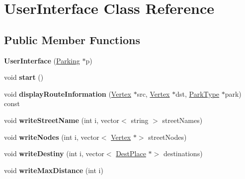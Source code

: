 \hypertarget{class_user_interface}{}\section{User\+Interface Class Reference}
\label{class_user_interface}
\subsection*{Public Member Functions}
\begin{DoxyCompactItemize}
\item 
\hypertarget{class_user_interface_a569e0a5f433d597e656022bd90b9259a}{}\label{class_user_interface_a569e0a5f433d597e656022bd90b9259a} 
{\bfseries User\+Interface} (\hyperlink{class_parking}{Parking} $\ast$p)
\item 
\hypertarget{class_user_interface_a79350878c72585ae34e4321613ed2c1a}{}\label{class_user_interface_a79350878c72585ae34e4321613ed2c1a} 
void {\bfseries start} ()
\item 
\hypertarget{class_user_interface_a888e925ed97f4f5638888541c9b7cef3}{}\label{class_user_interface_a888e925ed97f4f5638888541c9b7cef3} 
void {\bfseries display\+Route\+Information} (\hyperlink{class_vertex}{Vertex} $\ast$src, \hyperlink{class_vertex}{Vertex} $\ast$dst, \hyperlink{class_park_type}{Park\+Type} $\ast$park) const
\item 
\hypertarget{class_user_interface_a100153eda48264c4c42b4a160154d509}{}\label{class_user_interface_a100153eda48264c4c42b4a160154d509} 
void {\bfseries write\+Street\+Name} (int i, vector$<$ string $>$ street\+Names)
\item 
\hypertarget{class_user_interface_a435af017d1108efb94c432ca1da7f781}{}\label{class_user_interface_a435af017d1108efb94c432ca1da7f781} 
void {\bfseries write\+Nodes} (int i, vector$<$ \hyperlink{class_vertex}{Vertex} $\ast$$>$ street\+Nodes)
\item 
\hypertarget{class_user_interface_a371d1bf51f34aaf27a43ab9f9a2f2ec6}{}\label{class_user_interface_a371d1bf51f34aaf27a43ab9f9a2f2ec6} 
void {\bfseries write\+Destiny} (int i, vector$<$ \hyperlink{class_dest_place}{Dest\+Place} $\ast$$>$ destinations)
\item 
\hypertarget{class_user_interface_a0c2643f4ea48fbbac3f62810ecba1ccd}{}\label{class_user_interface_a0c2643f4ea48fbbac3f62810ecba1ccd} 
void {\bfseries write\+Max\+Distance} (int i)
\item 
\hypertarget{class_user_interface_acc1ec31ca4b80b81f6888745939c2075}{}\label{class_user_interface_acc1ec31ca4b80b81f6888745939c2075} 

\end{DoxyCompactItemize}
